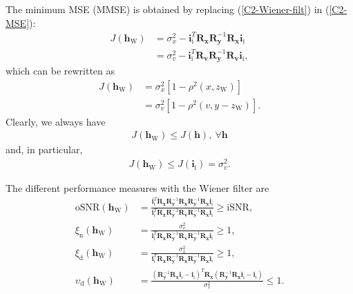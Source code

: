 \documentclass[10pt,pdflatex,headrule,landscape]{beamer}
\begin{document}
\begin{frame}[allowframebreaks]

The minimum MSE (MMSE) is obtained by replacing (\ref{C2-Wiener-filt}) in (\ref{C2-MSE}):
\begin{align}
\label{C2-MMSE}
 J\left( \mathbf{h}_{\mathrm{W}} \right) &= \sigma_x^2 - \mathbf{i}_{\mathrm{i}}^T \mathbf{R}_{\mathbf{x}}
 \mathbf{R}_{\mathbf{y}}^{-1} \mathbf{R}_{\mathbf{x}} \mathbf{i}_{\mathrm{i}} \\
  &= \sigma_v^2 - \mathbf{i}_{\mathrm{i}}^T \mathbf{R}_{\mathbf{v}}
 \mathbf{R}_{\mathbf{y}}^{-1} \mathbf{R}_{\mathbf{v}} \mathbf{i}_{\mathrm{i}}, \nonumber
\end{align}
which can be rewritten as
\begin{align}
\label{C2-MMSE2}
 J\left( \mathbf{h}_{\mathrm{W}} \right) &= \sigma_x^2 \left[1 - \rho^2(x,z_{\mathrm{W}}) \right] \\
  &= \sigma_v^2 \left[1 - \rho^2(v,y-z_{\mathrm{W}}) \right]. \nonumber
\end{align}
Clearly, we always have
\begin{eqnarray}
 J\left( \mathbf{h}_{\mathrm{W}} \right) \leq J\left( \mathbf{h} \right), \ \forall \mathbf{h}
\end{eqnarray}
and, in particular,
\begin{eqnarray}
 J\left( \mathbf{h}_{\mathrm{W}} \right) \leq J\left( \mathbf{i}_{\mathrm{i}} \right) = \sigma_v^2 .
\end{eqnarray}

The different performance measures with the Wiener filter are
\begin{align}
 \mathrm{oSNR}\left( \mathbf{h}_{\mathrm{W}} \right) &= \frac{ \mathbf{i}_{\mathrm{i}}^T \mathbf{R}_{\mathbf{x}} \mathbf{R}_{\mathbf{y}}^{-1} \mathbf{R}_{\mathbf{x}} \mathbf{R}_{\mathbf{y}}^{-1} \mathbf{R}_{\mathbf{x}} \mathbf{i}_{\mathrm{i}} }
 { \mathbf{i}_{\mathrm{i}}^T \mathbf{R}_{\mathbf{x}} \mathbf{R}_{\mathbf{y}}^{-1} \mathbf{R}_{\mathbf{v}} \mathbf{R}_{\mathbf{y}}^{-1} \mathbf{R}_{\mathbf{x}} \mathbf{i}_{\mathrm{i}} } \geq \mathrm{iSNR} , \\
 \xi_{\mathrm{n}}\left( \mathbf{h}_{\mathrm{W}} \right) &= \frac{ \sigma_v^2 }
 { \mathbf{i}_{\mathrm{i}}^T \mathbf{R}_{\mathbf{x}} \mathbf{R}_{\mathbf{y}}^{-1} \mathbf{R}_{\mathbf{v}} \mathbf{R}_{\mathbf{y}}^{-1} \mathbf{R}_{\mathbf{x}} \mathbf{i}_{\mathrm{i}} } \geq 1 , \\
 \xi_{\mathrm{d}}\left( \mathbf{h}_{\mathrm{W}} \right) &= \frac{ \sigma_x^2 }
 { \mathbf{i}_{\mathrm{i}}^T \mathbf{R}_{\mathbf{x}} \mathbf{R}_{\mathbf{y}}^{-1} \mathbf{R}_{\mathbf{x}} \mathbf{R}_{\mathbf{y}}^{-1} \mathbf{R}_{\mathbf{x}} \mathbf{i}_{\mathrm{i}} } \geq 1, \\
 \upsilon_{\mathrm{d}}\left( \mathbf{h}_{\mathrm{W}} \right) &=
 \frac{ \left( \mathbf{R}_{\mathbf{y}}^{-1} \mathbf{R}_{\mathbf{x}} \mathbf{i}_{\mathrm{i}} - \mathbf{i}_{\mathrm{i}} \right)^T \mathbf{R}_{\mathbf{x}} \left( \mathbf{R}_{\mathbf{y}}^{-1} \mathbf{R}_{\mathbf{x}} \mathbf{i}_{\mathrm{i}} - \mathbf{i}_{\mathrm{i}} \right) } { \sigma_x^2 } \leq 1.
\end{align}


\end{frame}
\end{document}
